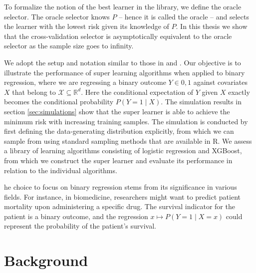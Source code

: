 \documentclass[11pt, a4paper]{article}
\theoremstyle{definition}
\theoremstyle{remark}
\begin{document}
To formalize the notion of the best learner in the library, we define the oracle selector. The oracle selector knows $ P $ -- hence it is called the oracle -- and selects the learner with the lowest risk given its knowledge of $ P $. In this thesis we show that the cross-validation selector is asymptotically equivalent to the oracle selector as the sample size goes to infinity. 

We adopt the setup and notation similar to those in \cite{vaart06} and \cite{laan03}. Our objective is to illustrate the performance of super learning algorithms when applied to binary regression, where we are regressing a binary outcome $ Y \in {0,1} $ against covariates $ X $ that belong to $ \mathcal{X} \subseteq \mathbb{R}^{d} $. Here the conditional expectation of $ Y $ given $ X $ exactly becomes the conditional probability $ P(Y = 1 \mid X) $. The simulation results in section \ref{sec:simulations} show that the super learner is able to achieve the minimum risk with increasing training samples. The simulation is conducted by first defining the data-generating distribution explicitly, from which we can sample from using standard sampling methods that are available in R. We assess a library of learning algorithms consisting of logistic regression and XGBoost, from which we construct the super learner and evaluate its performance in relation to the individual algorithms.

he choice to focus on binary regression stems from its significance in various fields. For instance, in biomedicine, researchers might want to predict patient mortality upon administering a specific drug. The survival indicator for the patient is a binary outcome, and the regression $ x \mapsto P(Y = 1 \mid X = x) $ could represent the probability of the patient's survival. 

\section{Background}
\end{document}
